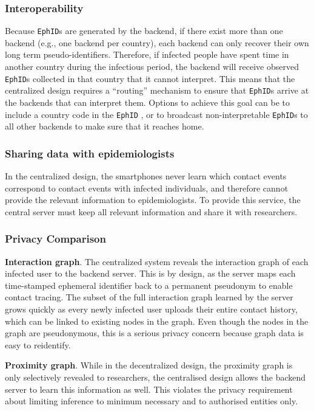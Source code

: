 \documentclass[10.8pt,a4paper]{article}
\begin{document}
\subsubsection{Interoperability}
Because \texttt{EphID}s are generated by the backend, if there exist more than one backend (e.g., one backend per country), each backend can only recover their own long term
pseudo-identifiers. Therefore, if infected people have spent time in another country during the infectious period, the backend will receive observed \texttt{EphID}s collected in that country that it cannot interpret. This means that the centralized design requires a “routing” mechanism to ensure that \texttt{EphID}s arrive at the backends that can interpret them. Options to achieve this goal can be to include a country code in the \texttt{EphID} , or to broadcast non-interpretable \texttt{EphID}s  to all other backends to make sure that it reaches home.
\subsubsection{Sharing data with epidemiologists}
In the centralized design, the smartphones never learn which contact events correspond to
contact events with infected individuals, and therefore cannot provide the relevant
information to epidemiologists. To provide this service, the central server must keep all
relevant information and share it with researchers.
\subsubsection{Privacy Comparison}
\textbf{Interaction graph}. The centralized system reveals the interaction graph of each infected user to the backend server. This is by design, as the server maps each time-stamped ephemeral identifier back to a permanent pseudonym to enable contact tracing. The subset of the full interaction graph learned by the server grows quickly as every newly infected user uploads their entire contact history, which can be linked to existing nodes in the graph. Even though the nodes in the graph are pseudonymous, this is a serious privacy concern because graph data is easy to reidentify.

\textbf{Proximity graph}. While in the decentralized design, the proximity graph is only selectively revealed to researchers, the centralised design allows the backend server to learn this information as well. This violates the privacy requirement about limiting inference to minimum necessary and to authorised entities only.
\end{document}
